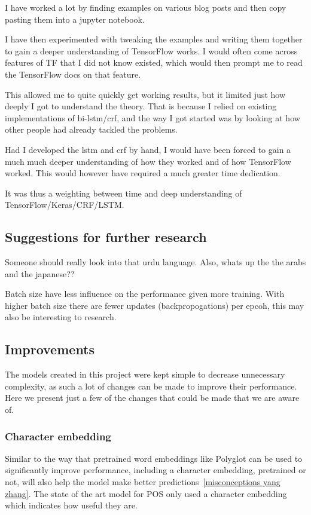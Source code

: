 I have worked a lot by finding examples on various blog posts and then copy
pasting them into a jupyter notebook.

I have then experimented with tweaking the examples and writing them together to
gain a deeper understanding of TensorFlow works. I would often come across
features of TF that I did not know existed, which would then prompt me to read
the TensorFlow docs on that feature.

This allowed me to quite quickly get working results, but it limited just how
deeply I got to understand the theory. That is because I relied on existing
implementations of bi-lstm/crf, and the way I got started was by looking at how
other people had already tackled the problems.

Had I developed the lstm and crf by hand, I would have been forced to gain a
much much deeper understanding of how they worked and of how TensorFlow worked.
This would however have required a much greater time dedication.

It was thus a weighting between time and deep understanding of
TensorFlow/Keras/CRF/LSTM.\


\subsection{Suggestions for further research}

Someone should really look into that urdu language. Also, whats up the the arabs
and the japanese??

Batch size have less influence on the performance given more training.
With higher batch size there are fewer updates (backpropogations) per epcoh,
this may also be interesting to research.


\subsection{Improvements}

The models created in this project were kept simple to decrease unnecessary
complexity, as such a lot of changes can be made to improve their performance.
Here we present just a few of the changes that could be made that we are aware
of.

\subsubsection{Character embedding}

Similar to the way that pretrained word embeddings like Polyglot can be used to
significantly improve performance, including a character embedding, pretrained
or not, will also help the model make better predictions~\ref{misconceptions
yang zhang}. The state of the art model for POS only used a character embedding
which indicates how useful they are.

